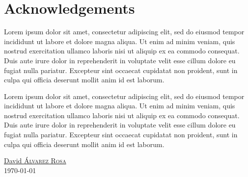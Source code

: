 \chapter*{Acknowledgements}

Lorem ipsum dolor sit amet, consectetur adipiscing elit, sed do eiusmod tempor
incididunt ut labore et dolore magna aliqua. Ut enim ad minim veniam, quis
nostrud exercitation ullamco laboris nisi ut aliquip ex ea commodo
consequat. Duis aute irure dolor in reprehenderit in voluptate velit esse
cillum dolore eu fugiat nulla pariatur. Excepteur sint occaecat cupidatat non
proident, sunt in culpa qui officia deserunt mollit anim id est laborum.

Lorem ipsum dolor sit amet, consectetur adipiscing elit, sed do eiusmod tempor
incididunt ut labore et dolore magna aliqua. Ut enim ad minim veniam, quis
nostrud exercitation ullamco laboris nisi ut aliquip ex ea commodo
consequat. Duis aute irure dolor in reprehenderit in voluptate velit esse
cillum dolore eu fugiat nulla pariatur. Excepteur sint occaecat cupidatat non
proident, sunt in culpa qui officia deserunt mollit anim id est laborum.

\begin{flushright}
  \href{https://david.alvarezrosa.com/}{David \textsc{Álvarez Rosa}}\\
  \today
\end{flushright}

\vspace{2ex}
\begin{center}
\end{center}



\tableofcontents
\listoffigures
\listoftables
{}